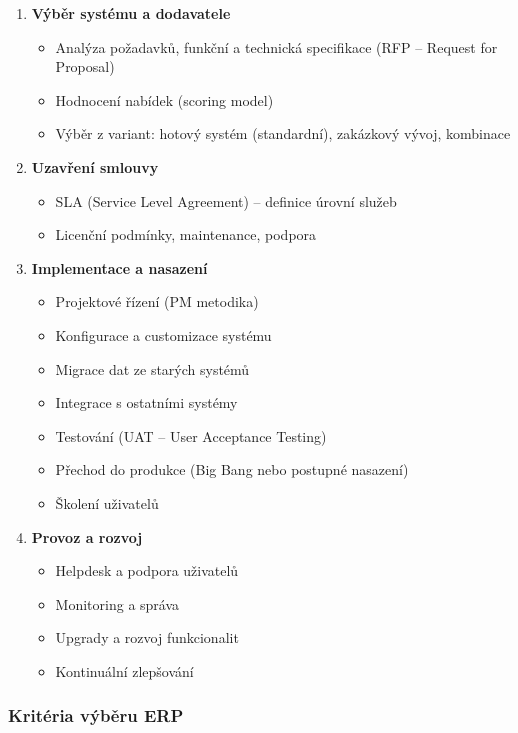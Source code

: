 \begin{enumerate}
  \item \textbf{Výběr systému a dodavatele}
    \begin{itemize}
      \item Analýza požadavků, funkční a technická specifikace (RFP -- Request for Proposal)
      \item Hodnocení nabídek (scoring model)
      \item Výběr z variant: hotový systém (standardní), zakázkový vývoj, kombinace
    \end{itemize}

  \item \textbf{Uzavření smlouvy}
    \begin{itemize}
      \item SLA (Service Level Agreement) -- definice úrovní služeb
      \item Licenční podmínky, maintenance, podpora
    \end{itemize}

  \item \textbf{Implementace a nasazení}
    \begin{itemize}
      \item Projektové řízení (PM metodika)
      \item Konfigurace a customizace systému
      \item Migrace dat ze starých systémů
      \item Integrace s ostatními systémy
      \item Testování (UAT -- User Acceptance Testing)
      \item Přechod do produkce (Big Bang nebo postupné nasazení)
      \item Školení uživatelů
    \end{itemize}

  \item \textbf{Provoz a rozvoj}
    \begin{itemize}
      \item Helpdesk a podpora uživatelů
      \item Monitoring a správa
      \item Upgrady a rozvoj funkcionalit
      \item Kontinuální zlepšování
    \end{itemize}
\end{enumerate}

\subsubsection{Kritéria výběru ERP}

